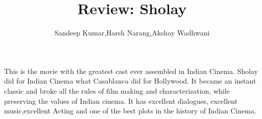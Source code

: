 \documentclass{article}
\title{Review: Sholay}
\author{Sandeep Kumar,Harsh Narang,Akshay Wadhwani}
\begin{document}
\maketitle
This is the movie with the greatest cast ever assembled in Indian Cinema. Sholay did for Indian Cinema what Casablanca did for Hollywood. It became an instant classic and broke all the rules of film making and characterization, while preserving the values of Indian cinema. It has excellent dialogues, excellent music,excellent Acting and one of the best plots in the history of Indian Cinema.
\end{document}

